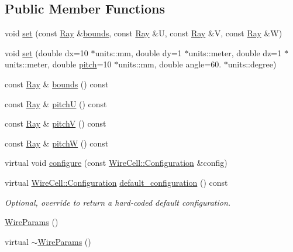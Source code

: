 \subsection*{Public Member Functions}
\begin{DoxyCompactItemize}
\item 
void \hyperlink{class_wire_cell_1_1_wire_params_a7ad51fcb64c9edae1695873f1bec86dc}{set} (const \hyperlink{namespace_wire_cell_a3ab20d9b438feb7eb1ffaab9ba98af0c}{Ray} \&\hyperlink{class_wire_cell_1_1_wire_params_a20e01f2e7d229f28e0e2d414b36b4e57}{bounds}, const \hyperlink{namespace_wire_cell_a3ab20d9b438feb7eb1ffaab9ba98af0c}{Ray} \&U, const \hyperlink{namespace_wire_cell_a3ab20d9b438feb7eb1ffaab9ba98af0c}{Ray} \&V, const \hyperlink{namespace_wire_cell_a3ab20d9b438feb7eb1ffaab9ba98af0c}{Ray} \&W)
\item 
void \hyperlink{class_wire_cell_1_1_wire_params_ac1e2cdbafe981979f06d802675f1e8ff}{set} (double dx=10 $\ast$units\+::mm, double dy=1 $\ast$units\+::meter, double dz=1 $\ast$units\+::meter, double \hyperlink{class_wire_cell_1_1_i_wire_parameters_aafb960715541113e82448f74e0f34e46}{pitch}=10 $\ast$units\+::mm, double angle=60. $\ast$units\+::degree)
\item 
const \hyperlink{namespace_wire_cell_a3ab20d9b438feb7eb1ffaab9ba98af0c}{Ray} \& \hyperlink{class_wire_cell_1_1_wire_params_a20e01f2e7d229f28e0e2d414b36b4e57}{bounds} () const
\item 
const \hyperlink{namespace_wire_cell_a3ab20d9b438feb7eb1ffaab9ba98af0c}{Ray} \& \hyperlink{class_wire_cell_1_1_wire_params_a8d61eb6c6ef8d3320172840079891322}{pitchU} () const
\item 
const \hyperlink{namespace_wire_cell_a3ab20d9b438feb7eb1ffaab9ba98af0c}{Ray} \& \hyperlink{class_wire_cell_1_1_wire_params_a5bcff5a348b5ad2a26e8e0a6a3c63258}{pitchV} () const
\item 
const \hyperlink{namespace_wire_cell_a3ab20d9b438feb7eb1ffaab9ba98af0c}{Ray} \& \hyperlink{class_wire_cell_1_1_wire_params_a8b310b4fe56d7c1eda061473ec86b5d0}{pitchW} () const
\item 
virtual void \hyperlink{class_wire_cell_1_1_wire_params_a8d20db605558e5fa6afaa7c5cf53ae4f}{configure} (const \hyperlink{namespace_wire_cell_a9f705541fc1d46c608b3d32c182333ee}{Wire\+Cell\+::\+Configuration} \&config)
\item 
virtual \hyperlink{namespace_wire_cell_a9f705541fc1d46c608b3d32c182333ee}{Wire\+Cell\+::\+Configuration} \hyperlink{class_wire_cell_1_1_wire_params_a062a30e00693380e0cf1d74f463b63b9}{default\+\_\+configuration} () const
\begin{DoxyCompactList}\small\item\em Optional, override to return a hard-\/coded default configuration. \end{DoxyCompactList}\item 
\hyperlink{class_wire_cell_1_1_wire_params_a444210719faa33678a688b00b89ac0b4}{Wire\+Params} ()
\item 
virtual \hyperlink{class_wire_cell_1_1_wire_params_aa66d971049ed2ece8e46eaeefadbc1bb}{$\sim$\+Wire\+Params} ()
\end{DoxyCompactItemize}
